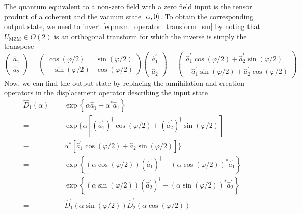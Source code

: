 The quantum equivalent to a non-zero field with a zero field input is the tensor product of a coherent and the vacuum state $\ket{\alpha,0}$.
To obtain the corresponding output state, we need to invert \cref{eq:mzm_operator_transform_sm} by noting that $U_\text{MZM}\in O(2)$ is an orthogonal transform for which the inverse is simply the transpose
\begin{equation}
    \begin{pmatrix}
        \hat{a}_1
        \\
        \hat{a}_2
    \end{pmatrix}
    =
    \begin{pmatrix}
        \cos(\varphi/2) & \sin(\varphi/2)
        \\
        -\sin(\varphi/2) & \cos(\varphi/2)
    \end{pmatrix}
    \begin{pmatrix}
        \hat{a}_1^\prime
        \\
        \hat{a}_2^\prime
    \end{pmatrix}
    =
    \begin{pmatrix}
        \hat{a}_1^\prime\cos(\varphi/2) + \hat{a}_2^\prime\sin(\varphi/2)
        \\
       -\hat{a}_1^\prime\sin(\varphi/2) + \hat{a}_2^\prime\cos(\varphi/2)
    \end{pmatrix}
\label{eq:mzm_operator_transform_inverse_sm}.
\end{equation}
Now, we can find the output state by replacing the annihilation and creation operators in the displacement operator describing the input state~\cite[p.~134]{Haroche2006}
\begin{align}
    \hat{D}_1(\alpha)
    =&
    \exp\left\{\alpha\hat{a}_1^\dagger-\alpha^*\hat{a}_1\right\}
    \\
    =&
    \exp\biggl\{
        \alpha\left[(\hat{a}_1^\prime)^\dagger\cos(\varphi/2) + (\hat{a}_2^\prime)^\dagger\sin(\varphi/2)\right]
        \\
        -&
        \alpha^*\left[\hat{a}_1^\prime\cos(\varphi/2) + \hat{a}_2^\prime\sin(\varphi/2)\right]
    \biggr\}
    \\
    =&
    \exp\left\{
        \left(\alpha\cos(\varphi/2)\right)(\hat{a}_1^\prime)^\dagger
        -
        \left(\alpha\cos(\varphi/2)\right)^*\hat{a}_1^\prime
    \right\}
    \\
    &\exp\left\{
        \left(\alpha\sin(\varphi/2)\right)(\hat{a}_2^\prime)^\dagger
        -
        \left(\alpha\sin(\varphi/2)\right)^*\hat{a}_2^\prime
    \right\}
    \\
    =&
    \hat{D}^\prime_1\left(\alpha\sin(\varphi/2)\right)
    \hat{D}^\prime_2\left(\alpha\cos(\varphi/2)\right)
\end{align}
